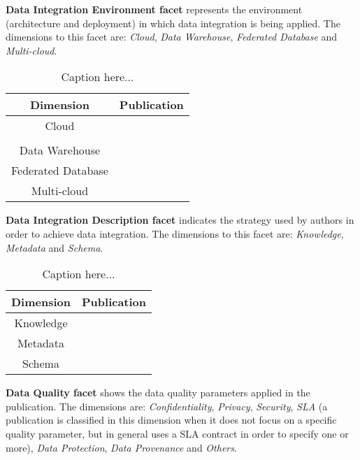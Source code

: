 \begin{description}
\item \textbf{Data Integration Environment facet} represents the environment (architecture and deployment) in which data integration is being applied. The dimensions to this facet are: \textit{Cloud}, \textit{Data Warehouse}, \textit{Federated Database} and \textit{Multi-cloud}.
\begin{table}[h]
\caption{Caption here...}
\begin{center}
\begin{tabular}{|c|c|}
\hline 
\textbf{Dimension} & \textbf{Publication} \\ 
\hline 
Cloud & \cite{068,070,072,073,074,075,076,077,078,079,081,082,083,085} \\ 
      & \cite{087,088,089,090,094,095,096,097,098,099,100,102,103,105,106,107,108,109,110,113}\\ 
\hline 
Data Warehouse & \cite{066,091,114} \\ 
\hline 
Federated Database & \cite{071,089,112} \\ 
\hline 
Multi-cloud & \cite{012,071,093} \\ 
\hline 
\end{tabular}
\end{center}
\end{table}
\item \textbf{Data Integration Description facet} indicates the strategy used by authors in order to achieve data integration. The dimensions to this facet are: \textit{Knowledge}, \textit{Metadata} and \textit{Schema}.
\begin{table}[h]
\caption{Caption here...}
\begin{center}
\begin{tabular}{|c|c|}
\hline 
\textbf{Dimension} & \textbf{Publication} \\ 
\hline 
Knowledge & \cite{012,083} \\ 
\hline 
Metadata & \cite{066,108,113} \\ 
\hline 
Schema & \cite{070,071,072,073,075,083,089,091,102,112,114} \\ 
\hline 
\end{tabular}
\end{center}
\end{table}
\item \textbf{Data Quality facet} shows the data quality parameters applied in the publication. The dimensions are: \textit{Confidentiality}, \textit{Privacy}, \textit{Security}, \textit{SLA} (a publication is classified in this dimension when it does not focus on a specific quality parameter, but in general uses a SLA contract in order to specify one or more), \textit{Data Protection}, \textit{Data Provenance} and \textit{Others}.

\end{description}
